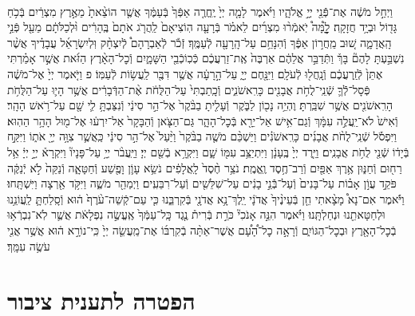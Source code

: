 \documentclass[twoside, openany, parskip=half, 11pt]{book}
\begin{document}
\begin{footnotesize}
\begin{multicols}{2}
\\
וַיְחַ֣ל מֹשֶׁ֔ה אֶת־פְּֿֿנֵ֖י יְיָ֣ אֱלֹהָ֑יו וַיֹּ֗אמֶר לָמָ֤ה יְיָ֙ יֶֽחֱרֶ֤ה אַפְּֿךָ֙ בְּֿעַמֶּ֔ךָ אֲשֶׁ֤ר הוֹצֵ֨אתָ֙ מֵאֶ֣רֶץ מִצְרַ֔יִם בְּֿכֹ֥חַ גָּד֖וֹל וּבְיָ֥ד חֲזָקָֽה׃ לׇׇׇׇׇׇׇׇָ֩מָּה֩ יֹֽאמְֿר֨וּ מִצְרַ֜יִם לֵאמֹ֗ר בְּֿרָעָ֤ה הֽוֹצִיאָם֙ לַֽהֲרֹ֤ג אֹתָם֙ בֶּֽהָרִ֔ים וּ֨לְכַלֹּתָ֔ם מֵעַ֖ל פְּֿנֵ֣י הָֽאֲדָמָ֑ה שׁ֚וּב מֵֽחֲר֣וֹן אַפֶּ֔ךָ וְֿהִנָּחֵ֥ם עַל־הָֽרָעָ֖ה לְֿעַמֶּֽךָ׃ זְֿכֹ֡ר לְֿאַבְרָהָם֩ לְֿיִצְחָ֨ק וּֽלְיִשְׂרָאֵ֜ל עֲבָדֶ֗יךָ אֲשֶׁ֨ר נִשְׁבַּ֣עְתָּ לָהֶם֘ בָּךְ֒ וַתְּֿדַבֵּ֣ר אֲלֵהֶ֔ם אַרְבֶּה֙ אֶֽת־זַרְעֲכֶ֔ם כְּֿכֽוֹכְֿבֵ֖י הַשָּׁמָ֑יִם וְֿכׇל־הָאָ֨רֶץ הַזֹּ֜את אֲשֶׁ֣ר אָמַ֗רְתִּי אֶתֵּן֙ לְֿזַֽרְעֲכֶ֔ם וְֿנָֽחֲל֖וּ לְֿעֹלָֽם׃ וַיִּנָּ֖חֶם יְיָ֑ עַל־הָ֣רָעָ֔ה אֲשֶׁ֥ר דִּבֶּ֖ר לַֽעֲשׂ֥וֹת לְֿעַמּֽוֹ׃ פ
וַיֹּ֤אמֶר יְיָ֙ אֶל־מֹשֶׁ֔ה פְּֿסָל־לְֿֿךָ֛ שְֿׁנֵֽי־לֻחֹ֥ת אֲבָנִ֖ים כָּרִֽאשֹׁנִ֑ים וְֿכָֽתַבְתִּי֙ עַל־הַלֻּחֹ֔ת אֶ֨ת־הַדְּֿבָרִ֔ים אֲשֶׁ֥ר הָי֛וּ עַל־הַלֻּחֹ֥ת הָרִֽאשֹׁנִ֖ים אֲשֶׁ֥ר שִׁבַּֽרְתָּ׃ וֶהְיֵ֥ה נָכ֖וֹן לַבֹּ֑קֶר וְֿעָלִ֤יתָ בַבֹּ֨קֶר֙ אֶל־הַ֣ר סִינַ֔י וְֿנִצַּבְתָּ֥ לִ֛י שָׁ֖ם עַל־רֹ֥אשׁ הָהָֽר׃ וְֿאִישׁ֙ לֹא־יַֽעֲלֶ֣ה עִמָּ֔ךְ וְֿגַם־אִ֥ישׁ אַל־יֵרָ֖א בְּֿכׇל־הָהָ֑ר גַּם־הַצֹּ֤אן וְֿהַבָּקָר֙ אַל־יִרְע֔וּ אֶל־מ֖וּל הָהָ֥ר הַהֽוּא׃ 
וַיִּפְסֹ֡ל שְֿׁנֵֽי־לֻחֹ֨ת אֲבָנִ֜ים כָּרִֽאשֹׁנִ֗ים וַיַּשְׁכֵּ֨ם מֹשֶׁ֤ה בַבֹּ֨קֶר֙ וַיַּ֨עַל֙ אֶל־הַ֣ר סִינַ֔י כַּֽאֲשֶׁ֛ר צִוָּ֥ה יְיָ֖ אֹת֑וֹ וַיִּקַּ֣ח בְּֿיָד֔וֹ שְֿׁנֵ֖י לֻחֹ֥ת אֲבָנִֽים׃ וַיֵּ֤רֶד יְיָ֙ בֶּֽעָנָ֔ן וַיִּתְיַצֵּ֥ב עִמּ֖וֹ שָׁ֑ם וַיִּקְרָ֥א בְֿשֵׁ֖ם יְיָ׃ וַיַּֽעֲבֹ֨ר יְיָ֥ עַל־פָּנָיו֘ וַיִּקְרָא֒ יְיָ֣ יְיָ֔ אֵ֥ל רַח֖וּם וְֿחַנּ֑וּן אֶ֥רֶךְ אַפַּ֖יִם וְֿרַב־חֶ֥סֶד וֶֽאֱמֶֽת׃ נֹצֵ֥ר חֶ֨סֶד֙ לָֽאֲלָפִ֔ים נֹשֵׂ֥א עָוֹ֛ן וָפֶ֖שַׁע וְֿחַטָּאָ֑ה וְֿנַקֵּה֙ לֹ֣א יְֿנַקֶּ֔ה פֹּקֵ֣ד עֲוֹ֣ן אָב֗וֹת עַל־בָּנִים֙ וְֿעַל־בְּֿֿנֵ֣י בָנִ֔ים עַל־שִׁלֵּשִׁ֖ים וְֿעַל־רִבֵּעִֽים׃ וַיְמַהֵ֖ר מֹשֶׁ֑ה וַיִּקֹּ֥ד אַ֖רְצָה וַיִּשְׁתָּֽחוּ׃ וַיֹּ֡אמֶר אִם־נָא֩ מָצָ֨אתִי חֵ֤ן בְּֿעֵינֶ֨יךָ֙ אֲדֹנָ֔י יֵֽלֶךְ־נָ֥א אֲדֹנָ֖י בְּֿקִרְבֵּ֑נוּ כִּ֤י עַם־קְֿשֵׁה־עֹ֨רֶף֙ ה֔וּא וְֿסָֽלַחְתָּ֛ לַֽעֲוֹנֵ֥נוּ וּלְחַטָּאתֵ֖נוּ וּנְחַלְתָּֽנוּ׃ וַיֹּ֗אמֶר הִנֵּ֣ה אָנֹכִי֘ כֹּרֵ֣ת בְּֿרִית֒ נֶ֤גֶד כָּֽל־עַמְּֿךָ֙ אֶֽעֱשֶׂ֣ה נִפְלָאֹ֔ת אֲשֶׁ֛ר לֹֽא־נִבְרְֿא֥וּ בְֿכׇל־הָאָ֖רֶץ וּבְכׇל־הַגּוֹיִ֑ם וְֿרָאָ֣ה כׇל־הָ֠עָ֠ם אֲשֶׁר־אַתָּ֨ה בְֿקִרְבּ֜וֹ אֶת־מַֽעֲשֵׂ֤ה יְיָ֙ כִּֽי־נוֹרָ֣א ה֔וּא אֲשֶׁ֥ר אֲנִ֖י עֹשֶׂ֥ה עִמָּֽךְ׃

\end{multicols}

\section*{הפטרה לתענית ציבור}



\end{footnotesize}
\end{document}

